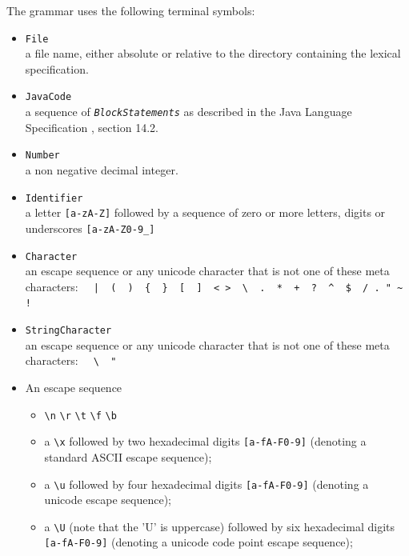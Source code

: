 \documentclass[11pt]{scrartcl}
\newcommand{\trit}{\em}
\begin{document}
\label{Terminals}
The grammar uses the following terminal symbols:   
\begin{itemize}
\item \texttt{File}\\
  a file name, either absolute or relative to the directory containing 
  the lexical specification.

\item \texttt{JavaCode}\\
  a sequence of {\trit \texttt{BlockStatements}} as described in the Java
  Language Specification \cite{LangSpec}, section 14.2.

\item \texttt{Number}\\
  a non negative decimal integer.
  
\item \texttt{Identifier}\\
  a letter \verb+[a-zA-Z]+ followed by a sequence of zero or more
  letters, digits or underscores \verb+[a-zA-Z0-9_]+

\item \texttt{Character}\\
  an escape sequence or any unicode character that is not one of these
  meta characters:
  \verb:  |  (  )  {  }  [  ]  < >  \  .  *  +  ?  ^  $  / . " ~ !:

\item \texttt{StringCharacter}\\   
  an escape sequence or any unicode character that is not one of these
  meta characters:
  \verb:  \  ":

\item
  An escape sequence

  \begin{itemize}
  \item
    \verb+\n+  \verb+\r+  \verb+\t+  \verb+\f+  \verb+\b+

  \item
    a \verb+\x+ followed by two hexadecimal digits \texttt{[a-fA-F0-9]} (denoting
    a standard ASCII escape sequence);
    
  \item
    a \verb+\u+ followed by four hexadecimal digits \texttt{[a-fA-F0-9]}
    (denoting a unicode escape sequence);

  \item
    a \verb+\U+ (note that the 'U' is uppercase) followed by six hexadecimal
    digits \texttt{[a-fA-F0-9]} (denoting a unicode code point escape sequence);
    

\end{itemize}
\end{itemize}
\end{document}
